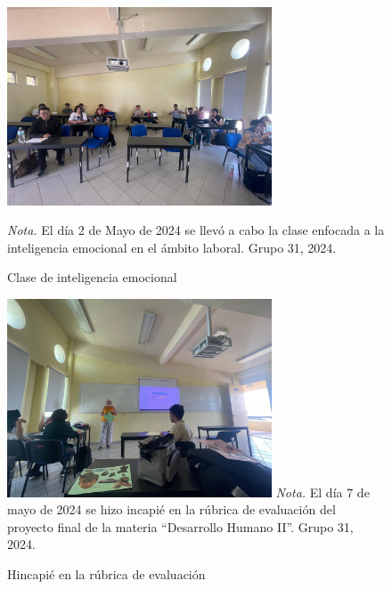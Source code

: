 \begin{figure}
    \caption{Clase de inteligencia emocional\label{fig:No.3}}
    \includegraphics[width=0.7\textwidth]{./assets/img/imagen3DH.jpeg}

	\textit{Nota.} El d\'ia 2 de Mayo de 2024 se llev\'o a cabo la clase enfocada a la inteligencia emocional en el ámbito laboral. Grupo 31, 2024.
\end{figure}

\begin{figure}
    \caption{Hincapi\'e en la r\'ubrica de evaluaci\'on\label{fig:No.4}}

    \includegraphics[width=0.7\textwidth]{./assets/img/imagen4DH.jpeg}
	\textit{Nota.} El día 7 de mayo de 2024 se hizo incapi\'e en la r\'ubrica de evaluaci\'on del proyecto final de la materia ``Desarrollo Humano II''. Grupo 31, 2024.
\end{figure}

